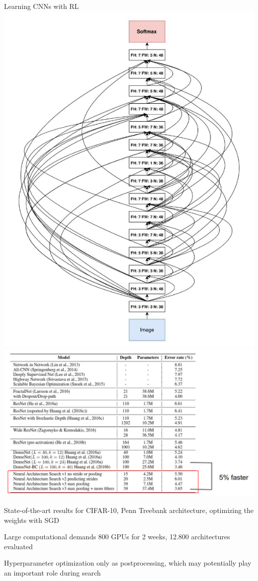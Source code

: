 \begin{frame}[c]{Learning CNNs with RL }
\centering
\includegraphics[width=.3\textwidth]{images_lec7/RL_CNN}
\includegraphics[width=.69\textwidth]{images_lec7/RL_results_table}

\begin{itemize}
\footnotesize{
	\item State-of-the-art results for CIFAR-10, Penn Treebank
	architecture, optimizing the weights with SGD
	\item Large computational demands \alert{800 GPUs for 2 weeks, 
	12.800 architectures evaluated}
	\item Hyperparameter optimization only as postprocessing, which may potentially play an important role during search
}
\end{itemize}
\end{frame}


